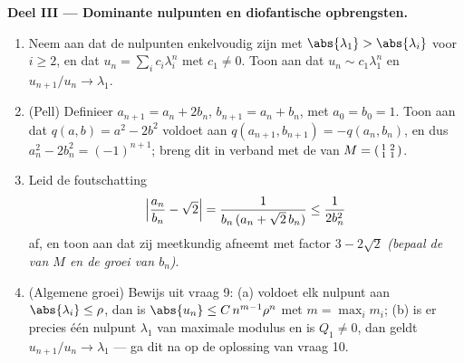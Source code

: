 \begin{problem}
\medskip
\noindent\textbf{Deel III --- Dominante nulpunten en diofantische
opbrengsten.}
\begin{enumerate}[resume]
  \item Neem aan dat de nulpunten enkelvoudig zijn met
        $\abs{\lambda_1} > \abs{\lambda_i}$ voor $i \geq 2$, en
        dat $u_n = \sum_i c_i \lambda_i^n$ met $c_1 \neq 0$. Toon
        aan dat $u_n \sim c_1\lambda_1^n$ en $u_{n+1}/u_n \to
        \lambda_1$.
  \item (Pell) Definieer $a_{n+1} = a_n + 2b_n$, $b_{n+1} = a_n +
        b_n$, met $a_0 = b_0 = 1$. Toon aan dat $q(a, b) = a^2 -
        2b^2$ voldoet aan $q(a_{n+1}, b_{n+1}) = -q(a_n, b_n)$, en
        dus $a_n^2 - 2b_n^2 = (-1)^{n+1}$; breng dit in verband
        met de  van $M = \begin{psmallmatrix}1 & 2\\ 1
        & 1\end{psmallmatrix}$.
  \item Leid de foutschatting
        \[
        \Bigl|\frac{a_n}{b_n} - \sqrt2\Bigr|
        = \frac{1}{b_n\,(a_n + \sqrt2\,b_n)}
        \leq \frac{1}{2b_n^2}
        \]
        af, en toon aan dat zij meetkundig afneemt met factor $3 -
        2\sqrt2$ \emph{(bepaal de  van $M$ en de groei
        van $b_n$)}.
  \item (Algemene groei) Bewijs uit vraag 9: (a) voldoet elk
        nulpunt aan $\abs{\lambda_i} \leq \rho$, dan is
        $\abs{u_n} \leq C\,n^{m-1}\rho^n$ met $m = \max_i m_i$;
        (b) is er precies één nulpunt $\lambda_1$ van maximale
        modulus en is $Q_1 \neq 0$, dan geldt $u_{n+1}/u_n \to
        \lambda_1$ --- ga dit na op de oplossing van vraag 10.
\end{enumerate}


\end{problem}
